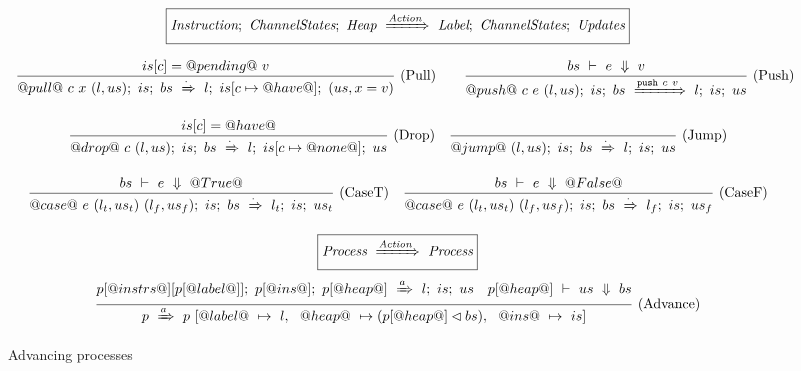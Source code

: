 
\begin{figure*}
\begin{minipage}[t]{1\textwidth}

$$
  \boxed{
    \textit{Instruction};~\textit{ChannelStates};~\textit{Heap}~\xRightarrow{\textit{Action}}~\textit{Label};~\textit{ChannelStates};~\textit{Updates}
  }
$$

$$
\ruleIN{
  is[c] = @pending@~v
}{
  \ProcBlockShake
        {@pull@~c~x~(l,us)}
        {is}
        {bs}
        {\cdot}
        {l}
        {is[c \mapsto @have@]}
        {(us, x = v)}
}{Pull}
%
\quad
%
\ruleIN{
  \ExpEval{bs}{e}{v}
}{
  \ProcBlockShake
        {@push@~c~e~(l,us)}
        {is}
        {bs}
        {\Push~c~v}
        {l}
        {is}
        {us}
}{Push}
$$

$$
\enskip \frac {\displaystyle 
  is[c] = @have@
} {\displaystyle 
  @drop@~c~(l,us);~is;~bs~\xRightarrow{\cdot}~l;~is[c \mapsto @none@];~us
} \  \mbox{(Drop)} \enskip
\enskip \frac {\displaystyle 
} {\displaystyle 
  @jump@~(l,us);~is;~bs~\xRightarrow{\cdot}~l;~is;~us
} \  \mbox{(Jump)} \enskip
$$

$$
\enskip \frac {\displaystyle 
  bs~\vdash~e~\Downarrow~@True@
} {\displaystyle 
  @case@~e~(l_t,us_t)~(l_f,us_f);~is;~bs~\xRightarrow{\cdot}~l_t;~is;~us_t
} \  \mbox{(CaseT)} \enskip
\enskip \frac {\displaystyle 
  bs~\vdash~e~\Downarrow~@False@
} {\displaystyle 
  @case@~e~(l_t,us_t)~(l_f,us_f);~is;~bs~\xRightarrow{\cdot}~l_f;~is;~us_f
} \  \mbox{(CaseF)} \enskip
$$

\vspace{2em}

$$
  \boxed{\textit{Process}~\xRightarrow{\textit{Action}}~\textit{Process}}
$$
$$
\enskip \frac {\displaystyle 
  p[@instrs@][p[@label@]];~p[@ins@];~p[@heap@]~\xRightarrow{a}~l;~is;~us
  \quad
    p[@heap@]~\vdash~us~\Downarrow~bs
} {\displaystyle 
  p~\xRightarrow{a}~p~[    @label@~ \mapsto ~l
           , ~~ @heap@~  \mapsto (p[@heap@] \lhd bs)
           , ~~ @ins@~   \mapsto ~is]
} \  \mbox{(Advance)} \enskip
$$


\end{minipage}
\caption{Advancing processes}

\label{fig:Process:Eval:Shake}
\end{figure*}

